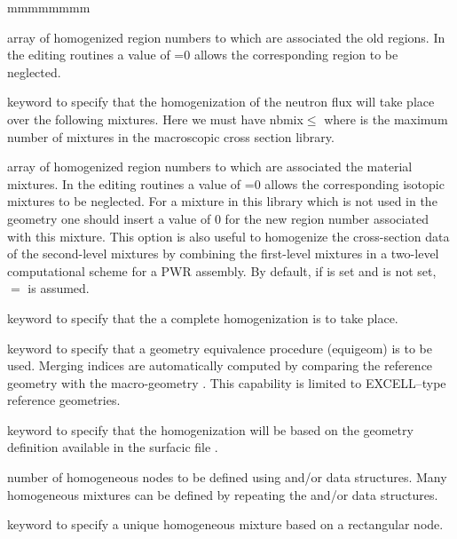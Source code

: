 \begin{ListeDeDescription}{mmmmmmmm}
\item[\dusa{iregm}] array of homogenized region numbers to which are
associated the old regions. In the editing routines a value of =0
allows the corresponding region to be neglected. 

\item[\moc{MIX}] keyword to specify that the homogenization of the neutron
flux will take place over the following mixtures. Here
we must have nbmix$\le$ where  is the maximum number
of mixtures in the macroscopic cross section library.  

\item[\dusa{imixm}] array of homogenized region numbers to which are
associated the material mixtures. In the editing routines a value of
=0 allows the corresponding isotopic mixtures to be neglected. For a mixture in this
library which is not used in the geometry one should insert a value of 0 for the
new region number associated with this mixture. This option is also useful to homogenize the cross-section data of the second-level mixtures by combining the first-level mixtures in
a two-level computational scheme for a PWR assembly. By default, if  is set and
 is not set, $=$ is assumed.

\item[\moc{COMP}] keyword to specify that the a complete homogenization is to
take place. 

\item[\moc{GEO}] keyword to specify that a geometry equivalence procedure (equigeom) is to be used. Merging indices
are automatically computed by comparing the reference geometry  with the macro-geometry .
This capability is limited to EXCELL--type reference geometries.

\item[\moc{G2S}] keyword to specify that the homogenization will be based on the geometry definition available in the surfacic
file .

\item[\dusa{nhom}] number of homogeneous nodes to be defined using  and/or  data structures. Many homogeneous mixtures can be defined by
repeating the  and/or  data structures.

\item[\moc{RECT}] keyword to specify a unique homogeneous mixture based on a rectangular node. 


\end{ListeDeDescription}
